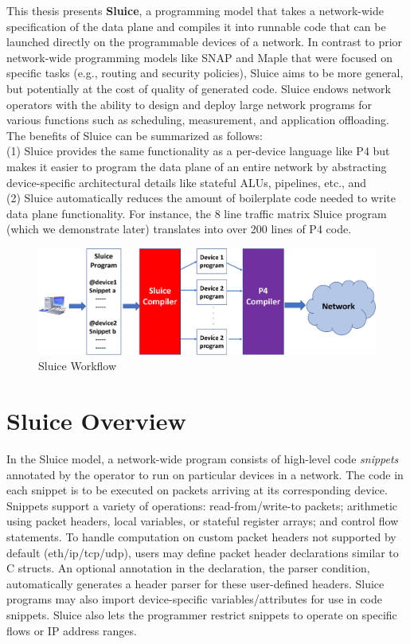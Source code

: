 \documentclass[12pt, oneside]{article}
\begin{document}
This thesis presents \textbf{Sluice}, a programming model that takes a
network-wide specification of the data plane and compiles it into runnable code
that can be launched directly on the programmable devices of a network. In
contrast to prior network-wide programming models like SNAP and Maple that were
focused on specific tasks (e.g., routing and security policies), Sluice aims to
be more general, but potentially at the cost of quality of generated code.
Sluice endows network operators with the ability to design and deploy large
network programs for various functions such as scheduling, measurement, and
application offloading.  The benefits of Sluice can be summarized as follows:\\
\quad  (1) Sluice provides the same functionality as a per-device language like P4 but makes it easier to program the data plane of an entire network by abstracting device-specific architectural details like stateful ALUs, pipelines, etc., and\\
\quad  (2) Sluice automatically reduces the amount of boilerplate code needed to write data plane functionality. For instance, the 8 line traffic matrix Sluice program (which we demonstrate later) translates into over 200 lines of P4 code. 

\begin{figure}
\centering
\includegraphics[width=140mm,scale=0.7]{figures/sluice_workflow.pdf}
\caption{Sluice Workflow}\label{fig1}
\end{figure}

\newpage
\section{Sluice Overview}
In the Sluice model, a network-wide program consists of high-level code
\textit{snippets} annotated by the operator to run on particular devices in a
network. The code in each snippet is to be executed on packets arriving at its
corresponding device. Snippets support a variety of operations:
read-from/write-to packets; arithmetic using packet headers, local variables, or
stateful register arrays; and control flow statements. To handle computation on
custom packet headers not supported by default (eth/ip/tcp/udp), users may
define packet header declarations similar to C structs. An optional annotation
in the declaration, the parser condition, automatically generates a header
parser for these user-defined headers. Sluice programs may also import
device-specific variables/attributes for use in code snippets. Sluice also lets
the programmer restrict snippets to operate on specific flows or IP address
ranges.
\end{document}

